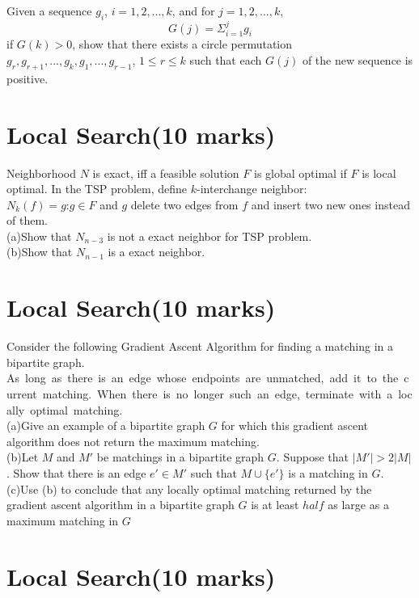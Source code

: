 \documentclass[a4paper,11pt]{article}
\begin{document}
Given a sequence $g_i$, $i=1,2,...,k$, and for $j=1,2,...,k$,
	  $$G(j)=\Sigma^j_{i=1} g_i$$
if $G(k)>0$, show that there exists a circle permutation $g_r,g_{r+1},...,g_k,g_1,...,g_{r-1}$, $1\leq r\leq k$ such that each $G(j)$ of the new sequence is positive.

\section{Local Search(10 marks)}

Neighborhood $N$ is exact, iff a feasible solution $F$ is global optimal if $F$ is local optimal. In the TSP problem, define $k$-interchange neighbor:\\
$N_k(f)=${$g$:$g\in F$ and $g$ delete two edges from $f$ and insert two new ones instead of them.}\\
	(a)Show that $N_{n-3}$ is not a exact neighbor for TSP problem.\\
	(b)Show that $N_{n-1}$ is a exact neighbor.

\section{Local Search(10 marks)}

Consider the following Gradient Ascent Algorithm for finding a matching in a bipartite graph.\\
			 As\ long\ as\ there\ is\ an\ edge\ whose\ endpoints\ are\ unmatched,\ add\ it\ to\ the\ current\ matching.\ When\ there\ is\ no\ longer\ such\ an\ edge,\ terminate\ with\ a\ locally\ optimal\ matching.\\
			 (a)Give an example of a bipartite graph $G$ for which this gradient ascent algorithm does not return the maximum matching.\\
			 (b)Let $M$ and $M'$ be matchings in a bipartite graph $G$. Suppose that $|M'|>2|M|$. Show that there is an edge $e'\in M'$ such that $M\cup \{ e'\} $ is a matching in $G$.\\
			 (c)Use (b) to conclude that any locally optimal matching returned by the gradient ascent algorithm in a bipartite graph $G$ is at least $half$ as large as a maximum matching in $G$

\section{Local Search(10 marks)}
\end{document}
